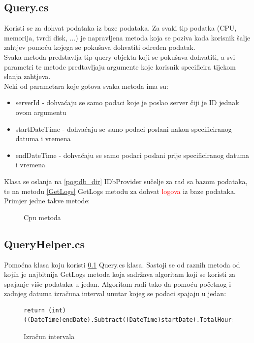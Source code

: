 \documentclass[zavrsnirad]{fer}
\begin{document}
\subsection{Query.cs}
\label{pog:query.cs}
Koristi se za dohvat podataka iz baze podataka. Za svaki tip podatka (CPU, memorija, tvrdi disk, ...) je napravljena metoda koja se poziva kada korisnik šalje zahtjev pomoću kojega se pokušava dohvatiti određen podatak.
\\Svaka metoda predstavlja tip query objekta koji se pokušava dohvatiti, a svi parametri te metode predtavljaju argumente koje korisnik specificira tijekom slanja zahtjeva.
\\Neki od parametara koje gotova svaka metoda ima su:
\begin{itemize}
	\item serverId - dohvaćaju se samo podaci koje je poslao server čiji je ID jednak ovom argumentu
	\item startDateTime - dohvaćaju se samo podaci poslani nakon specificiranog datuma i vremena
	\item endDateTime - dohvaćaju se samo podaci poslani prije specificiranog datuma i vremena
\end{itemize}
Klasa se oslanja na \ref{pog:db_dir} IDbProvider sučelje za rad sa bazom podataka, te na metodu \ref{GetLogs} GetLogs metodu za dohvat \textcolor{red}{logova} iz baze podataka.
\\Primjer jedne takve metode:
\begin{figure}[htb]
	\centering
	
	\caption{Cpu metoda}
\end{figure}
\FloatBarrier

\subsection{QueryHelper.cs}
Pomoćna klasa koju koristi \ref{pog:query.cs} Query.cs klasa. Sastoji se od raznih metoda od kojih je najbitnija GetLogs metoda koja sadržava algoritam koji se koristi za spajanje više podataka u jedan. Algoritam radi tako da pomoću početnog i zadnjeg datuma izračuna interval unutar kojeg se podaci spajaju u jedan:

\begin{figure}[htb]
	\centering
	\begin{lstlisting}[language=CSharp]
		return (int)((DateTime)endDate).Subtract((DateTime)startDate).TotalHours;
	\end{lstlisting}
	\caption{Izračun intervala}
\end{figure}
\FloatBarrier
\end{document}
